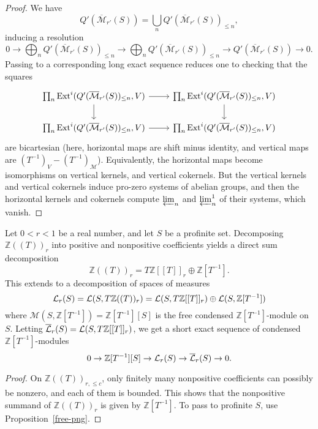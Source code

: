 \begin{proof}
  We have
  \[ Q'(\overline{\mathcal M}_{r'}(S)) = \bigcup_n Q'(\overline{\mathcal M}_{r'}(S))_{\leq n}, \]
  inducing a resolution
  \[ 0\to \bigoplus_n Q'(\overline{\mathcal M}_{r'}(S))_{\leq n}\to \bigoplus_n Q'(\overline{\mathcal M}_{r'}(S))_{\leq n}\to Q'(\overline{\mathcal M}_{r'}(S))\to 0.  \]
  Passing to a corresponding long exact sequence reduces one to checking that the squares
  \[ \begin{tikzcd}
  \prod_n \mathrm{Ext}^i(Q'(\overline{\mathcal M}_{r'}(S))_{\leq n},V)\ar[d]\ar[r] & \prod_n \mathrm{Ext}^i(Q'(\overline{\mathcal M}_{r'}(S))_{\leq n},V)\ar[d]\\
  \prod_n \mathrm{Ext}^i(Q'(\overline{\mathcal M}_{r'}(S))_{\leq n},V)\ar[r] & \prod_n \mathrm{Ext}^i(Q'(\overline{\mathcal M}_{r'}(S))_{\leq n},V)
  \end{tikzcd} \]
  are bicartesian (here, horizontal maps are shift minus identity, and vertical maps are $(T^{-1})_V - (T^{-1})_{\mathcal M}$).
  Equivalently, the horizontal maps become isomorphisms on vertical kernels, and vertical cokernels.
  But the vertical kernels and vertical cokernels induce pro-zero systems of abelian groups,
  and then the horizontal kernels and cokernels compute $\varprojlim_n$ and $\varprojlim_n^1$ of their systems, which vanish.
\end{proof}

\begin{proposition}
  \label{Lbar-ses}
  Let $0 < r < 1$ be a real number, and let $S$ be a profinite set.
  Decomposing $\mathbb Z((T))_r$ into positive and nonpositive coefficients yields a direct sum decomposition
  \[ \mathbb Z((T))_r = T\mathbb Z[[T]]_r \oplus \mathbb Z[T^{-1}]. \]
  This extends to a decomposition of spaces of measures
  \[ \mathcal L_r(S) = \mathcal L(S,T\mathbb Z((T))_r) = \mathcal L(S,T\mathbb Z[[T]]_r) \oplus \mathcal L(S,\mathbb Z[T^{-1}]) \]
  where $\mathcal M(S,\mathbb Z[T^{-1}]) = \mathbb Z[T^{-1}][S]$ is the free condensed $\mathbb Z[T^{-1}]$-module on $S$.
  Letting $\overline{\mathcal L}_r(S)= \mathcal L(S,T\mathbb Z[[T]]_r)$, we get a short exact sequence of condensed $\mathbb Z[T^{-1}]$-modules
  \[ 0 \to \mathbb Z[T^{-1}][S] \to \mathcal L_r(S) \to \overline{\mathcal L}_r(S) \to 0. \]
\end{proposition}

\begin{proof}
  On $\mathbb Z((T))_{r,\leq c}$, only finitely many nonpositive coefficients can possibly be nonzero, and each of them is bounded.
  This shows that the nonpositive summand of $\mathbb Z((T))_r$ is given by $\mathbb Z[T^{-1}]$.
  To pass to profinite $S$, use Proposition~\ref{free-png}.
\end{proof}

